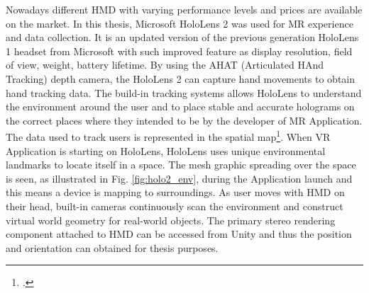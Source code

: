 Nowadays different HMD with varying performance levels and prices are available on the market. In this thesis, Microsoft HoloLens 2 was used for MR experience and data collection. It is an updated version of the previous generation HoloLens 1 headset from Microsoft with such improved feature as display resolution, field of view, weight, battery lifetime. By using the AHAT (Articulated HAnd Tracking) depth camera, the HoloLens 2 can capture hand movements to obtain hand tracking data. The build-in tracking systems allows HoloLens to understand the environment around the user and to place stable and accurate holograms on the correct places where they intended to be by the developer of MR Application. The data used to track users is represented in the spatial map\footcite{https://docs.microsoft.com/en-us/hololens/hololens-environment-considerations}. When VR Application is starting on HoloLens, HoloLens uses unique environmental landmarks to locate itself in a space. The mesh graphic spreading over the space is seen, as illustrated in Fig. \ref{fig:holo2_env}, during the Application launch and this means a device is mapping to surroundings. As user moves with HMD on their head, built-in cameras continuously scan the environment and construct virtual world geometry for real-world objects. The primary stereo rendering component attached to HMD can be accessed from Unity and thus the position and orientation can obtained for thesis purposes. 

